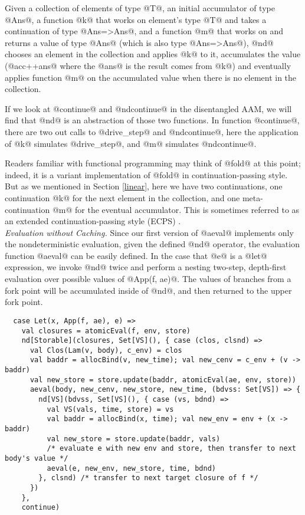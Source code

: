 \documentclass[acmsmall, review]{acmart}\settopmatter{}
\begin{document}
Given a collection of elements of type @T@, an initial accumulator of type 
@Ans@, a function @k@ that works on element's type @T@ and takes a continuation 
of type @Ans=>Ans@, and a function @m@ that works on and returns a value of type 
@Ans@ (which is also type @Ans=>Ans@), @nd@ chooses an element in the collection 
and applies @k@ to it, accumulates the value (@acc++ans@ where the @ans@ is the 
result comes from @k@) and eventually applies function @m@ on the accumulated 
value when there is no element in the collection.

If we look at @continue@ and @ndcontinue@ in the disentangled AAM, we will find
that @nd@ is an abstraction of those two functions. In function @continue@,
there are two out calls to @drive_step@ and @ndcontinue@, here the application
of @k@ simulates @drive_step@, and @m@ simulates @ndcontinue@.

Readers familiar with functional programming may think of @fold@ at this point; indeed,
it is a variant implementation of @fold@ in continuation-passing style. But as we mentioned 
in Section \ref{linear}, here we have two continuations, one continuation @k@ for the next 
element in the collection, and one meta-continuation @m@ for the eventual accumulator.
This is sometimes referred to as an extended continuation-passing style (ECPS) \cite{Danvy:1990:AC:91556.91622}. \\

\textit{Evaluation without Caching.}
Since our first version of @aeval@ implements only the nondeterministic evaluation, 
given the defined @nd@ operator, the evaluation function @aeval@ can be easily defined. 
In the case that @e@ is a @let@ expression, we invoke @nd@ twice and perform a nesting 
two-step, depth-first evaluation over possible values of @App(f, ae)@.
The values of branches from a fork point will be accumulated inside of @nd@, and 
then returned to the upper fork point.

\begin{lstlisting}
  case Let(x, App(f, ae), e) =>
    val closures = atomicEval(f, env, store)
    nd[Storable](closures, Set[VS](), { case (clos, clsnd) =>
      val Clos(Lam(v, body), c_env) = clos
      val baddr = allocBind(v, new_time); val new_cenv = c_env + (v -> baddr)
      val new_store = store.update(baddr, atomicEval(ae, env, store))
      aeval(body, new_cenv, new_store, new_time, (bdvss: Set[VS]) => {
        nd[VS](bdvss, Set[VS](), { case (vs, bdnd) =>
          val VS(vals, time, store) = vs
          val baddr = allocBind(x, time); val new_env = env + (x -> baddr)
          val new_store = store.update(baddr, vals)
          /* evaluate e with new env and store, then transfer to next body's value */
          aeval(e, new_env, new_store, time, bdnd)
        }, clsnd) /* transfer to next target closure of f */
      })
    },
    continue)
\end{lstlisting}
\end{document}
